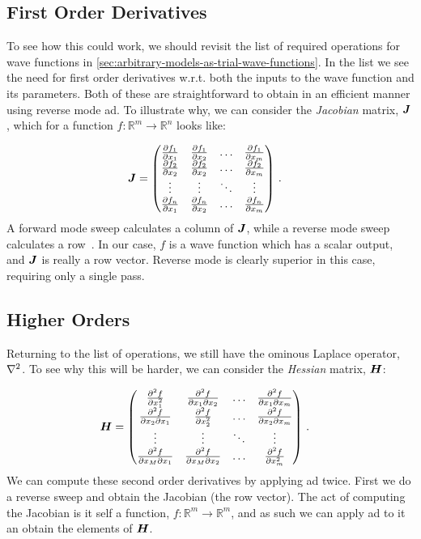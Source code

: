 \documentclass[Thesis.tex]{subfiles}
\begin{document}
\subsection{First Order Derivatives}

To see how this could work, we should revisit the list of required operations
for wave functions in \cref{sec:arbitrary-models-as-trial-wave-functions}. In
the list we see the need for first order derivatives w.r.t. both the inputs to
the wave function and its parameters. Both of these are straightforward to
obtain in an efficient manner using reverse mode \gls{ad}. To illustrate why, we can
consider the \emph{Jacobian} matrix, $\bm{J}$, which for a function
$f:\mathbb{R}^m\to\mathbb{R}^n$ looks like:

\begin{align}
  \bm{J} &=
  \begin{pmatrix}
    \pdv{f_1}{x_1} & \pdv{f_1}{x_2} & \dots & \pdv{f_1}{x_m}\\
    \pdv{f_2}{x_2} & \pdv{f_2}{x_2} & \dots & \pdv{f_2}{x_m}\\
    \vdots & \vdots & \ddots & \vdots\\
    \pdv{f_n}{x_1} & \pdv{f_n}{x_2} & \dots & \pdv{f_n}{x_m}\\
  \end{pmatrix}\,.
\end{align}
A forward mode sweep calculates a column of $\bm{J}$, while a reverse mode sweep
calculates a row~\cite{auto-diff-Berland}. In our case, $f$ is a wave function
which has a scalar output, and $\bm{J}$ is really a row vector. Reverse mode is
clearly superior in this case, requiring only a single pass.

\subsection{Higher Orders}

Returning to the list of operations, we still have the ominous Laplace
operator, $\laplacian$. To see why this will be harder, we can consider the
\emph{Hessian} matrix, $\bm{H}$:

\begin{align}
  \bm{H} &=
  \begin{pmatrix}
    \pdv[2]{f}{x_1} & \pdv{f}{x_1}{x_2} & \dots & \pdv{f}{x_1}{x_m}\\
    \pdv{f}{x_2}{x_1} & \pdv[2]{f}{x_2} & \dots & \pdv{f}{x_2}{x_m}\\
    \vdots & \vdots & \ddots & \vdots\\
    \pdv{f}{x_M}{x_1} & \pdv{f}{x_M}{x_2} & \dots & \pdv[2]{f}{x_m}\\
  \end{pmatrix}\,.
\end{align}
We can compute these second order derivatives by applying \gls{ad} twice. First we do
a reverse sweep and obtain the Jacobian (the row vector). The act of computing
the Jacobian is it self a function, $f: \mathbb{R}^m\to\mathbb{R}^m$, and as
such we can apply \gls{ad} to it an obtain the elements of $\bm{H}$.
\end{document}
